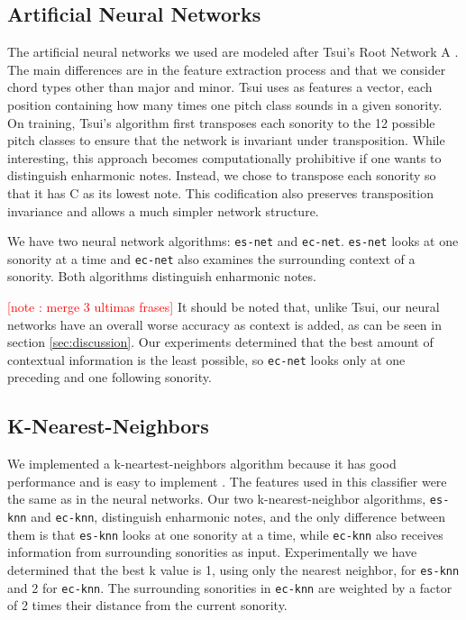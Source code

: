 \documentclass{article}
\newcounter{notecounter}
\newcommand{\note}[1]{
  \addtocounter{notecounter}{1}
  \textcolor{red}{[note \arabic{notecounter}: #1]}
}
\begin{document}
\subsection{Artificial Neural Networks}
\label{sec:neural-net}


The artificial neural networks we used are modeled after Tsui's Root
Network A \cite{tsui:harmonic}. The main differences are in the
feature extraction process and that we consider chord types other than
major and minor. Tsui uses as features a vector, each position
containing how many times one pitch class sounds in a given
sonority. On training, Tsui's algorithm first transposes each sonority
to the 12 possible pitch classes to ensure that the network is
invariant under transposition. While interesting, this approach
becomes computationally prohibitive if one wants to distinguish
enharmonic notes. Instead, we chose to transpose each sonority so that
it has C as its lowest note. This codification also preserves
transposition invariance and allows a much simpler network structure.

We have two neural network algorithms: \texttt{es-net} and
\texttt{ec-net}. \texttt{es-net} looks at one sonority at a time and
\texttt{ec-net} also examines the surrounding context of a sonority.
Both algorithms distinguish enharmonic notes. \note{merge 3 ultimas
  frases} It should be noted that, unlike Tsui, our neural networks
have an overall worse accuracy as context is added, as can be seen in
section \ref{sec:discussion}. Our experiments determined that the best
amount of contextual information is the least possible, so
\texttt{ec-net} looks only at one preceding and one following
sonority.


\subsection{K-Nearest-Neighbors}
\label{sec:knn}

We implemented a k-neartest-neighbors algorithm because it has good
performance and is easy to implement \cite{fix.ea:important,
  gomez.ea:estimating}. The features used in this classifier were the
same as in the neural networks. Our two k-nearest-neighbor algorithms,
\texttt{es-knn} and \texttt{ec-knn}, distinguish enharmonic notes, and
the only difference between them is that \texttt{es-knn} looks at one
sonority at a time, while \texttt{ec-knn} also receives information
from surrounding sonorities as input. Experimentally we have
determined that the best k value is 1, using only the nearest
neighbor, for \texttt{es-knn} and 2 for \texttt{ec-knn}. The
surrounding sonorities in \texttt{ec-knn} are weighted by a factor of
2 times their distance from the current sonority.
\end{document}
